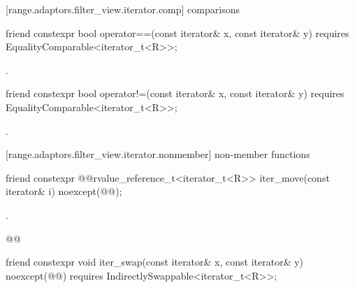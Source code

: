 [range.adaptors.filter_view.iterator.comp]{ comparisons}

%
\begin{itemdecl}
friend constexpr bool operator==(const iterator& x, const iterator& y)
  requires EqualityComparable<iterator_t<R>>;
\end{itemdecl}

\begin{itemdescr}
\pnum
\returns {}.
\end{itemdescr}

%
\begin{itemdecl}
friend constexpr bool operator!=(const iterator& x, const iterator& y)
  requires EqualityComparable<iterator_t<R>>;
\end{itemdecl}

\begin{itemdescr}
\pnum
\returns {}.
\end{itemdescr}

[range.adaptors.filter_view.iterator.nonmember]{ non-member functions}

%
\begin{itemdecl}
friend constexpr @@rvalue_reference_t<iterator_t<R>> iter_move(const iterator& i)
  noexcept(@\oldtxt{\seebelow}@);
\end{itemdecl}

\begin{itemdescr}
\pnum
\returns {}.

\pnum
{}
\begin{codeblock}
@@
\end{codeblock}
\end{itemdescr}

%
\begin{itemdecl}
friend constexpr void iter_swap(const iterator& x, const iterator& y)
  noexcept(@\oldtxt{\seebelow}@)
  requires IndirectlySwappable<iterator_t<R>>;
\end{itemdecl}

